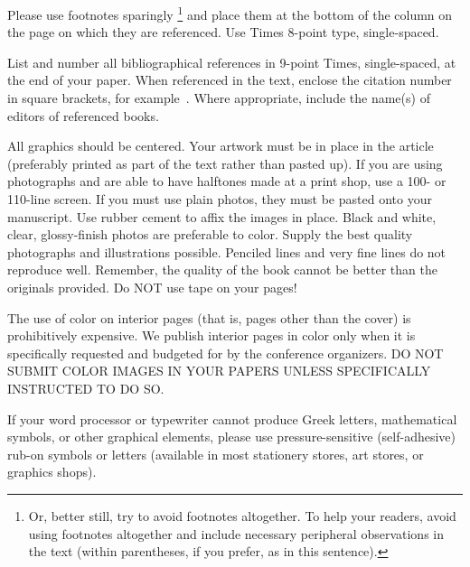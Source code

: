 \documentclass[times, 10pt,twocolumn]{article}
\begin{document}

Please use footnotes sparingly%
\footnote
   {%
     Or, better still, try to avoid footnotes altogether.  To help your 
     readers, avoid using footnotes altogether and include necessary 
     peripheral observations in the text (within parentheses, if you 
     prefer, as in this sentence).
   }
and place them at the bottom of the column on the page on which they are 
referenced. Use Times 8-point type, single-spaced.



List and number all bibliographical references in 9-point Times, 
single-spaced, at the end of your paper. When referenced in the text, 
enclose the citation number in square brackets, for example~\cite{ex1}. 
Where appropriate, include the name(s) of editors of referenced books.


All graphics should be centered. Your artwork must be in place in the 
article (preferably printed as part of the text rather than pasted up). 
If you are using photographs and are able to have halftones made at a 
print shop, use a 100- or 110-line screen. If you must use plain photos, 
they must be pasted onto your manuscript. Use rubber cement to affix the 
images in place. Black and white, clear, glossy-finish photos are 
preferable to color. Supply the best quality photographs and 
illustrations possible. Penciled lines and very fine lines do not 
reproduce well. Remember, the quality of the book cannot be better than 
the originals provided. Do NOT use tape on your pages!


The use of color on interior pages (that is, pages other
than the cover) is prohibitively expensive. We publish interior pages in 
color only when it is specifically requested and budgeted for by the 
conference organizers. DO NOT SUBMIT COLOR IMAGES IN YOUR 
PAPERS UNLESS SPECIFICALLY INSTRUCTED TO DO SO.


If your word processor or typewriter cannot produce Greek letters, 
mathematical symbols, or other graphical elements, please use 
pressure-sensitive (self-adhesive) rub-on symbols or letters (available 
in most stationery stores, art stores, or graphics shops).
\end{document}
